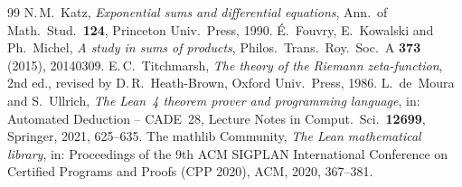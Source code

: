 \documentclass[11pt,colorlinks]{charlie}
\begin{document}
\begin{thebibliography}{99}
 N.\,M.~Katz, \emph{Exponential sums and differential equations}, Ann.\ of Math.\ Stud.\ \textbf{124}, Princeton Univ.\ Press, 1990.
 \'E.~Fouvry, E.~Kowalski and Ph.~Michel, \emph{A study in sums of products}, Philos.\ Trans.\ Roy.\ Soc.\ A \textbf{373} (2015), 20140309.
 E.\,C.~Titchmarsh, \emph{The theory of the Riemann zeta-function}, 2nd ed., revised by D.\,R.~Heath-Brown, Oxford Univ.\ Press, 1986.
 L.~de~Moura and S.~Ullrich, \emph{The Lean~4 theorem prover and programming language}, in: Automated Deduction -- CADE~28, Lecture Notes in Comput.\ Sci.\ \textbf{12699}, Springer, 2021, 625--635.
 The mathlib Community, \emph{The Lean mathematical library}, in: Proceedings of the 9th ACM SIGPLAN International Conference on Certified Programs and Proofs (CPP 2020), ACM, 2020, 367--381.
\end{thebibliography}
\end{document}
